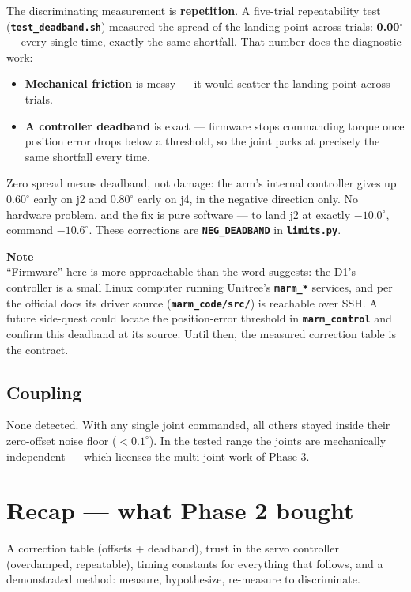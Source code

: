 \documentclass[11pt,twoside,openright]{book}
\newcommand{\code}[1]{\texttt{\bfseries #1}}
\newenvironment{pktnote}{\begin{pktbox}\textbf{Note}\\[4pt]}{\end{pktbox}}
\begin{document}
The discriminating measurement is \textbf{repetition}. A five-trial
repeatability test (\code{test\_deadband.sh}) measured the spread of the
landing point across trials: \textbf{0.00$^\circ$} --- every single
time, exactly the same shortfall. That number does the diagnostic work:

\begin{itemize}
  \item \textbf{Mechanical friction} is messy --- it would scatter the
    landing point across trials.
  \item \textbf{A controller deadband} is exact --- firmware stops
    commanding torque once position error drops below a threshold, so the
    joint parks at precisely the same shortfall every time.
\end{itemize}

Zero spread means deadband, not damage: the arm's internal controller
gives up $0.60^\circ$ early on j2 and $0.80^\circ$ early on j4, in the
negative direction only. No hardware problem, and the fix is pure
software --- to land j2 at exactly $-10.0^\circ$, command
$-10.6^\circ$. These corrections are \code{NEG\_DEADBAND} in
\code{limits.py}.

\begin{pktnote}
``Firmware'' here is more approachable than the word suggests: the D1's
controller is a small Linux computer running Unitree's \code{marm\_*}
services, and per the official docs its driver source
(\code{marm\_code/src/}) is reachable over SSH. A future side-quest could
locate the position-error threshold in \code{marm\_control} and confirm
this deadband at its source. Until then, the measured correction table is
the contract.
\end{pktnote}

\subsection{Coupling}

None detected. With any single joint commanded, all others stayed inside
their zero-offset noise floor ($<0.1^\circ$). In the tested range the
joints are mechanically independent --- which licenses the multi-joint
work of Phase 3.

\section{Recap --- what Phase 2 bought}

A correction table (offsets + deadband), trust in the servo controller
(overdamped, repeatable), timing constants for everything that follows,
and a demonstrated method: measure, hypothesize, re-measure to
discriminate.
\end{document}
